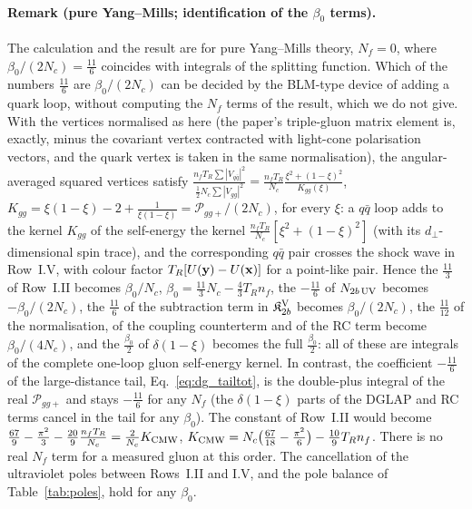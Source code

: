 \paragraph{Remark (pure Yang--Mills; identification of the $\beta_0$ terms).} The calculation and the result are for pure Yang--Mills theory, $N_f=0$, where $\beta_0/(2N_c)=\frac{11}{6}$ coincides with integrals of the splitting function. Which of the numbers $\frac{11}{6}$ are $\beta_0/(2N_c)$ can be decided by the BLM-type device of adding a quark loop, without computing the $N_f$ terms of the result, which we do not give. With the vertices normalised as here (the paper's triple-gluon matrix element is, exactly, minus the covariant vertex contracted with light-cone polarisation vectors, and the quark vertex is taken in the same normalisation), the angular-averaged squared vertices satisfy $\frac{n_fT_R\sum|V_{q\bar q}|^2}{\frac12N_c\sum|V_{gg}|^2}=\frac{n_fT_R}{N_c}\frac{\xi^2+(1-\xi)^2}{K_{gg}(\xi)}$, $K_{gg}=\xi(1-\xi)-2+\frac{1}{\xi(1-\xi)}=\mathcal P_{gg+}/(2N_c)$, for every $\xi$: a $q\bar q$ loop adds to the kernel $K_{gg}$ of the self-energy the kernel $\frac{n_fT_R}{N_c}[\xi^2+(1-\xi)^2]$ (with its $d_\perp$-dimensional spin trace), and the corresponding $q\bar q$ pair crosses the shock wave in Row~I.V, with colour factor $T_R[U(\mathbf{y})-U(\mathbf{x})]$ for a point-like pair. Hence the $\frac{11}{3}$ of Row~I.II becomes $\beta_0/N_c$, $\beta_0=\frac{11}{3}N_c-\frac43T_Rn_f$, the $-\frac{11}{6}$ of $N_{2b\,\rm UV}$ becomes $-\beta_0/(2N_c)$, the $\frac{11}{6}$ of the subtraction term in $\mathfrak K^{\rm V}_{2b}$ becomes $\beta_0/(2N_c)$, the $\frac{11}{12}$ of the normalisation, of the coupling counterterm and of the RC term become $\beta_0/(4N_c)$, and the $\frac{\beta_0}{2}$ of $\delta(1-\xi)$ becomes the full $\frac{\beta_0}{2}$: all of these are integrals of the complete one-loop gluon self-energy kernel. In contrast, the coefficient $-\frac{11}{6}$ of the large-distance tail, Eq.~\eqref{eq:dg_tailtot}, is the double-plus integral of the real $\mathcal P_{gg+}$ and stays $-\frac{11}{6}$ for any $N_f$ (the $\delta(1-\xi)$ parts of the DGLAP and RC terms cancel in the tail for any $\beta_0$). The constant of Row~I.II would become $\frac{67}{9}-\frac{\pi^2}{3}-\frac{20}{9}\frac{n_fT_R}{N_c}=\frac{2}{N_c}K_{\rm CMW}$, $K_{\rm CMW}=N_c\big(\frac{67}{18}-\frac{\pi^2}{6}\big)-\frac{10}{9}T_Rn_f$. There is no real $N_f$ term for a measured gluon at this order. The cancellation of the ultraviolet poles between Rows~I.II and I.V, and the pole balance of Table~\ref{tab:poles}, hold for any $\beta_0$.

